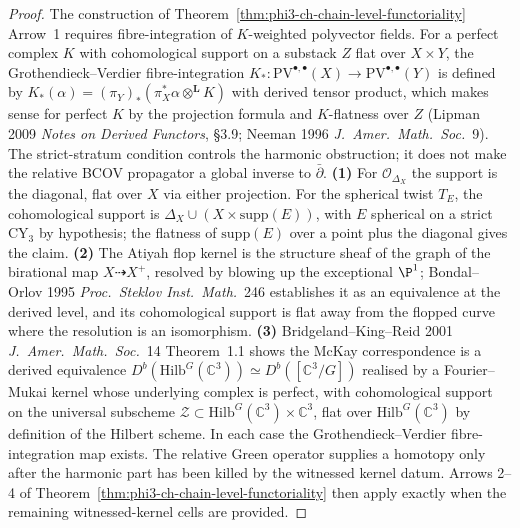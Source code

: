 \begin{proof}
The construction of Theorem~\ref{thm:phi3-ch-chain-level-functoriality} Arrow~1 requires fibre-integration of $K$-weighted polyvector fields. For a perfect complex $K$ with cohomological support on a substack $Z$ flat over $X \times Y$, the Grothendieck--Verdier fibre-integration $K_* \colon \mathrm{PV}^{\bullet,\bullet}(X) \to \mathrm{PV}^{\bullet,\bullet}(Y)$ is defined by $K_*(\alpha) = (\pi_Y)_*(\pi_X^* \alpha \otimes^{\mathbf{L}} K)$ with derived tensor product, which makes sense for perfect $K$ by the projection formula and $K$-flatness over $Z$ (Lipman 2009 \textit{Notes on Derived Functors}, \S3.9; Neeman 1996 \textit{J.~Amer.~Math.~Soc.}~9). The strict-stratum condition controls the harmonic obstruction; it does not make the relative BCOV propagator a global inverse to \(\bar\partial\).
\textbf{(1)} For $\mathcal{O}_{\Delta_X}$ the support is the diagonal, flat over $X$ via either projection. For the spherical twist $T_E$, the cohomological support is $\Delta_X \cup (X \times \mathrm{supp}(E))$, with $E$ spherical on a strict CY$_3$ by hypothesis; the flatness of $\mathrm{supp}(E)$ over a point plus the diagonal gives the claim.
\textbf{(2)} The Atiyah flop kernel is the structure sheaf of the graph of the birational map $X \dashrightarrow X^+$, resolved by blowing up the exceptional $\P^1$; Bondal--Orlov 1995 \textit{Proc.~Steklov Inst.~Math.}~246 establishes it as an equivalence at the derived level, and its cohomological support is flat away from the flopped curve where the resolution is an isomorphism.
\textbf{(3)} Bridgeland--King--Reid 2001 \textit{J.~Amer.~Math.~Soc.}~14 Theorem~1.1 shows the McKay correspondence is a derived equivalence $D^b(\mathrm{Hilb}^G(\mathbb{C}^3)) \simeq D^b([\mathbb{C}^3/G])$ realised by a Fourier--Mukai kernel whose underlying complex is perfect, with cohomological support on the universal subscheme $\mathcal{Z} \subset \mathrm{Hilb}^G(\mathbb{C}^3) \times \mathbb{C}^3$, flat over $\mathrm{Hilb}^G(\mathbb{C}^3)$ by definition of the Hilbert scheme.
In each case the Grothendieck--Verdier fibre-integration map exists.
The relative Green operator supplies a homotopy only after the harmonic
part has been killed by the witnessed kernel datum. Arrows 2--4 of
Theorem~\ref{thm:phi3-ch-chain-level-functoriality} then apply exactly
when the remaining witnessed-kernel cells are provided.
\end{proof}

